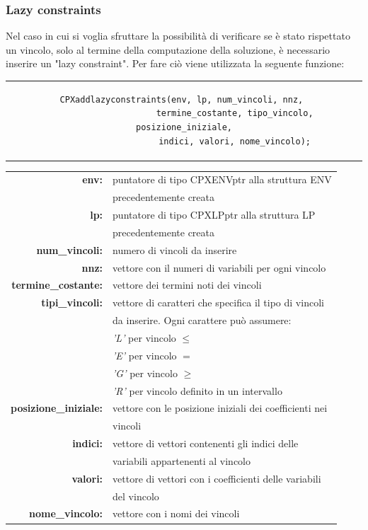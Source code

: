 \subsubsection{Lazy constraints}
Nel caso in cui si voglia sfruttare la possibilità di verificare se è stato rispettato un vincolo, solo al termine della computazione della soluzione, è necessario inserire un "lazy constraint". Per fare ciò viene utilizzata la seguente funzione:
\begin{center}
\begin{tabular}{c}
\begin{lstlisting}[linewidth=380pt, basicstyle=\footnotesize\sffamily,]     
CPXaddlazyconstraints(env, lp, num_vincoli, nnz, 
					termine_costante, tipo_vincolo, posizione_iniziale,
					indici, valori, nome_vincolo);
\end{lstlisting}
\end{tabular}
\end{center}
\begin{table}[h]
\centering
\begin{tabular}{rl}
\textbf{env:} & {puntatore di tipo CPXENVptr alla struttura ENV}\\
& {precedentemente creata}\\
\textbf{lp:} & {puntatore di tipo CPXLPptr alla struttura LP}\\
& {precedentemente creata}\\
\textbf{num\_vincoli:} & {numero di vincoli da inserire}\\
\textbf{nnz:} & {vettore con il numeri di variabili per ogni vincolo}\\ 
\textbf{termine\_costante:} & {vettore dei termini noti dei vincoli}\\
\textbf{tipi\_vincoli:} & {vettore di caratteri che specifica il tipo di vincoli}\\
&{da inserire. Ogni carattere può assumere:}\\
&{\textit{'L'} per vincolo $\leq$}\\
&{\textit{'E'} per vincolo $=$}\\
&{\textit{'G'} per vincolo $\geq$}\\
&{\textit{'R'} per vincolo definito in un intervallo}\\
\textbf{posizione\_iniziale:} & {vettore con le posizione iniziali dei coefficienti nei}\\
&{vincoli}\\
\textbf{indici:} & {vettore di vettori contenenti gli indici delle}\\
& {variabili appartenenti al vincolo}\\
\textbf{valori:} & {vettore di vettori con i coefficienti delle variabili }\\
&{del vincolo}\\
\textbf{nome\_vincolo:} & {vettore con i nomi dei vincoli}\\
\end{tabular}
\end{table}
